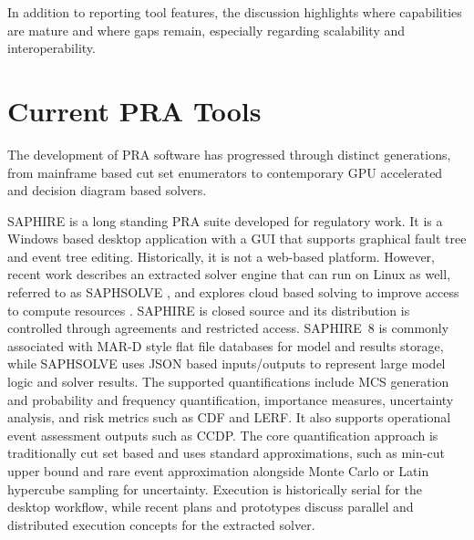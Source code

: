 In addition to reporting tool features, the discussion highlights where capabilities are mature and where gaps remain, especially regarding scalability and interoperability.

\section{Current PRA Tools}
\label{sec:lr-current-pra-tools}

The development of PRA software has progressed through distinct generations, from mainframe based cut set enumerators to contemporary GPU accelerated and decision diagram based solvers.

SAPHIRE \cite{saphire_8, saphire_809} is a long standing PRA suite developed for regulatory work. It is a Windows based desktop application with a GUI that supports graphical fault tree and event tree editing. Historically, it is not a web-based platform. However, recent work describes an extracted solver engine that can run on Linux as well, referred to as SAPHSOLVE \cite{diagnostics_strategies_saphire, refine_saphire_engine, enhancing_saphire_engine}, and explores cloud based solving to improve access to compute resources \cite{advancing_saphire}. SAPHIRE is closed source and its distribution is controlled through agreements and restricted access. SAPHIRE~8 is commonly associated with MAR-D style flat file databases for model and results storage, while SAPHSOLVE uses JSON based inputs/outputs to represent large model logic and solver results. The supported quantifications include MCS generation and probability and frequency quantification, importance measures, uncertainty analysis, and risk metrics such as CDF and LERF. It also supports operational event assessment outputs such as CCDP. The core quantification approach is traditionally cut set based and uses standard approximations, such as min-cut upper bound and rare event approximation alongside Monte Carlo or Latin hypercube sampling for uncertainty. Execution is historically serial for the desktop workflow, while recent plans and prototypes discuss parallel and distributed execution concepts for the extracted solver.


